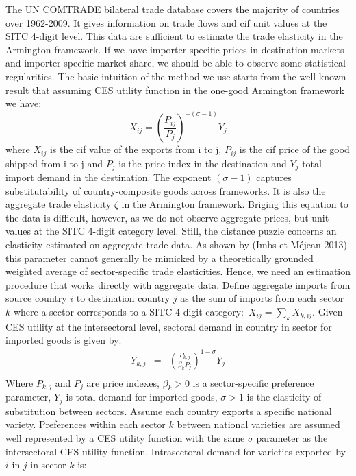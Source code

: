 \documentclass[12pt,twoside,a4paper,notitlepage]{article}
\begin{document}
The UN COMTRADE bilateral trade database covers the majority of countries over 1962-2009. It gives information on trade flows and cif unit values at the SITC 4-digit level. This data are sufficient to estimate the trade elasticity in the Armington framework. If we have importer-specific prices in destination markets and importer-specific market share, we should be able to observe some statistical regularities. The basic intuition of the method we use starts from the well-known result that assuming CES utility function in the one-good Armington framework we have:
\[{{X}_{ij}}={{\left( \frac{{{P}_{ij}}}{{{P}_{j}}} \right)}^{-(\sigma -1)}}{{Y}_{j}}\]
where ${X}_{ij}$ is the cif value of the exports from i to j, ${{P}_{ij}}$ is the cif price of the good shipped from i to j and ${{P}_{j}}$ is the price index in the destination and ${{Y}_{j}}$ total import demand in the destination. The exponent $\left( \sigma -1 \right)$ captures substitutability of country-composite goods across frameworks. It is also the aggregate trade elasticity $\zeta $ in the Armington framework.
Briging this equation to the data is difficult, however, as we do not observe aggregate prices, but unit values at the SITC 4-digit category level. Still, the distance puzzle concerns an elasticity estimated on aggregate trade data. As shown by (Imbs et Méjean 2013) this parameter cannot generally be mimicked by a theoretically grounded weighted average of sector-specific trade elasticities. Hence, we need an estimation procedure that works directly with aggregate data.
Define aggregate imports from source country $i$ to destination country $j$  as the sum of imports from each sector $k$ where a sector corresponds to a SITC 4-digit category: ${{X}_{ij}}=\sum\limits_{k}{{{X}_{k,ij}}}$. Given CES utility at the intersectoral level, sectoral demand in country  in sector  for imported goods is given by: 
\[\begin{array}{*{35}{l}}
   {{Y}_{k,j}} & = & {{\left( \frac{{{P}_{k,j}}}{{{\beta }_{k}}{{P}_{j}}} \right)}^{1-\sigma }}{{Y}_{j}}  \\
\end{array}\]
Where ${{P}_{k,j}}$ and ${{P}_{j}}$ are price indexes, ${{\beta }_{k}}>0$ is a sector-specific preference parameter, ${{Y}_{j}}$ is total demand for imported goods, $\sigma >1$ is the elasticity of substitution between sectors. 
 Assume each country exports a specific national variety. Preferences within each sector $k$ between national varieties are assumed well represented by a CES utility function with the same $\sigma $ parameter as the intersectoral CES utility function. Intrasectoral demand for varieties exported by $i$ in $j$ in sector $k$ is: 
\end{document}

